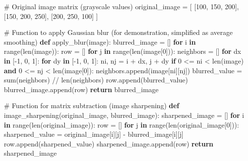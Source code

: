 \documentclass[
  letterpaper,
  DIV=11,
  numbers=noendperiod]{scrreprt}
\newenvironment{Shaded}{\begin{snugshade}}{\end{snugshade}}
\newcommand{\BuiltInTok}[1]{\textcolor[rgb]{0.00,0.23,0.31}{#1}}
\newcommand{\CommentTok}[1]{\textcolor[rgb]{0.37,0.37,0.37}{#1}}
\newcommand{\ControlFlowTok}[1]{\textcolor[rgb]{0.00,0.23,0.31}{\textbf{#1}}}
\newcommand{\DecValTok}[1]{\textcolor[rgb]{0.68,0.00,0.00}{#1}}
\newcommand{\KeywordTok}[1]{\textcolor[rgb]{0.00,0.23,0.31}{\textbf{#1}}}
\newcommand{\NormalTok}[1]{\textcolor[rgb]{0.00,0.23,0.31}{#1}}
\newcommand{\OperatorTok}[1]{\textcolor[rgb]{0.37,0.37,0.37}{#1}}
\theoremstyle{plain}
\theoremstyle{definition}
\theoremstyle{remark}
\begin{document}
\begin{Shaded}
\begin{Highlighting}[]
\CommentTok{\# Original image matrix (grayscale values)}
\NormalTok{original\_image }\OperatorTok{=}\NormalTok{ [}
\NormalTok{    [}\DecValTok{100}\NormalTok{, }\DecValTok{150}\NormalTok{, }\DecValTok{200}\NormalTok{],}
\NormalTok{    [}\DecValTok{150}\NormalTok{, }\DecValTok{200}\NormalTok{, }\DecValTok{250}\NormalTok{],}
\NormalTok{    [}\DecValTok{200}\NormalTok{, }\DecValTok{250}\NormalTok{, }\DecValTok{100}\NormalTok{]}
\NormalTok{]}

\CommentTok{\# Function to apply Gaussian blur (for demonstration, simplified as average smoothing)}
\KeywordTok{def}\NormalTok{ apply\_blur(image):}
\NormalTok{    blurred\_image }\OperatorTok{=}\NormalTok{ []}
    \ControlFlowTok{for}\NormalTok{ i }\KeywordTok{in} \BuiltInTok{range}\NormalTok{(}\BuiltInTok{len}\NormalTok{(image)):}
\NormalTok{        row }\OperatorTok{=}\NormalTok{ []}
        \ControlFlowTok{for}\NormalTok{ j }\KeywordTok{in} \BuiltInTok{range}\NormalTok{(}\BuiltInTok{len}\NormalTok{(image[}\DecValTok{0}\NormalTok{])):}
\NormalTok{            neighbors }\OperatorTok{=}\NormalTok{ []}
            \ControlFlowTok{for}\NormalTok{ dx }\KeywordTok{in}\NormalTok{ [}\OperatorTok{{-}}\DecValTok{1}\NormalTok{, }\DecValTok{0}\NormalTok{, }\DecValTok{1}\NormalTok{]:}
                \ControlFlowTok{for}\NormalTok{ dy }\KeywordTok{in}\NormalTok{ [}\OperatorTok{{-}}\DecValTok{1}\NormalTok{, }\DecValTok{0}\NormalTok{, }\DecValTok{1}\NormalTok{]:}
\NormalTok{                    ni, nj }\OperatorTok{=}\NormalTok{ i }\OperatorTok{+}\NormalTok{ dx, j }\OperatorTok{+}\NormalTok{ dy}
                    \ControlFlowTok{if} \DecValTok{0} \OperatorTok{\textless{}=}\NormalTok{ ni }\OperatorTok{\textless{}} \BuiltInTok{len}\NormalTok{(image) }\KeywordTok{and} \DecValTok{0} \OperatorTok{\textless{}=}\NormalTok{ nj }\OperatorTok{\textless{}} \BuiltInTok{len}\NormalTok{(image[}\DecValTok{0}\NormalTok{]):}
\NormalTok{                        neighbors.append(image[ni][nj])}
\NormalTok{            blurred\_value }\OperatorTok{=} \BuiltInTok{sum}\NormalTok{(neighbors) }\OperatorTok{//} \BuiltInTok{len}\NormalTok{(neighbors)}
\NormalTok{            row.append(blurred\_value)}
\NormalTok{        blurred\_image.append(row)}
    \ControlFlowTok{return}\NormalTok{ blurred\_image}

\CommentTok{\# Function for matrix subtraction (image sharpening)}
\KeywordTok{def}\NormalTok{ image\_sharpening(original\_image, blurred\_image):}
\NormalTok{    sharpened\_image }\OperatorTok{=}\NormalTok{ []}
    \ControlFlowTok{for}\NormalTok{ i }\KeywordTok{in} \BuiltInTok{range}\NormalTok{(}\BuiltInTok{len}\NormalTok{(original\_image)):}
\NormalTok{        row }\OperatorTok{=}\NormalTok{ []}
        \ControlFlowTok{for}\NormalTok{ j }\KeywordTok{in} \BuiltInTok{range}\NormalTok{(}\BuiltInTok{len}\NormalTok{(original\_image[}\DecValTok{0}\NormalTok{])):}
\NormalTok{            sharpened\_value }\OperatorTok{=}\NormalTok{ original\_image[i][j] }\OperatorTok{{-}}\NormalTok{ blurred\_image[i][j]}
\NormalTok{            row.append(sharpened\_value)}
\NormalTok{        sharpened\_image.append(row)}
    \ControlFlowTok{return}\NormalTok{ sharpened\_image}


\end{Highlighting}
\end{Shaded}
\end{document}
